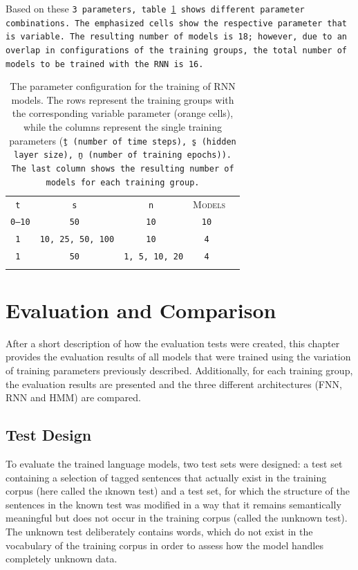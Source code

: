Based on these \tt{3} parameters, table \ref{t.training.tuning.rnn} shows different parameter combinations. The emphasized cells show the respective parameter that is variable. The resulting number of models is \tt{18}; however, due to an overlap in configurations of the training groups, the total number of models to be trained with the RNN is \tt{16}.

\begin{table}[ht]
	\vspace{2em}
	\centering\small{}\begin{tabular}{ c c c c c }
	\trule
	\tt{t} & \tt{s} & \tt{n} & \textsc{Models} \\
	\drule
	\cellcolor{orange}\color{white}\b{\tt{0}--\tt{10}} & \tt{50} & \tt{10} & \tt{10} \\
	\mrule
	\tt{1} & \cellcolor{orange}\color{white}\b{\tt{10}, \tt{25}, \tt{50}, \tt{100}} & \tt{10} & \tt{4} \\
	\mrule
	\tt{1} & \tt{50} & \cellcolor{orange}\color{white}\b{\tt{1}, \tt{5}, \tt{10}, \tt{20}} & \tt{4} \\
	\brule
	\end{tabular}
	\caption[Parameter combinations of RNN Models]{The parameter configuration for the training of RNN models. The rows represent the training groups with the corresponding variable parameter (orange cells), while the columns represent the single training parameters (\tt{\b{t}} (number of time steps), \tt{\b{s}} (hidden layer size), \tt{\b{n}} (number of training epochs)). The last column shows the resulting number of models for each training group.}
	\label{t.training.tuning.rnn}
\end{table}

\chapter{Evaluation and Comparison}\label{c.evaluation}
After a short description of how the evaluation tests were created, this chapter provides the evaluation results of all models that were trained using the variation of training parameters previously described. Additionally, for each training group, the evaluation results are presented and the three different architectures (FNN, RNN and HMM) are compared.

\section{Test Design}\label{c.evaluation.test}
To evaluate the trained language models, two test sets were designed: a test set containing a selection of tagged sentences that actually exist in the training corpus (here called the \i{known test}) and a test set, for which the structure of the sentences in the known test was modified in a way that it remains semantically meaningful but does not occur in the training corpus (called the \i{unknown test}). The unknown test deliberately contains words, which do not exist in the vocabulary of the training corpus in order to assess how the model handles completely unknown data.


